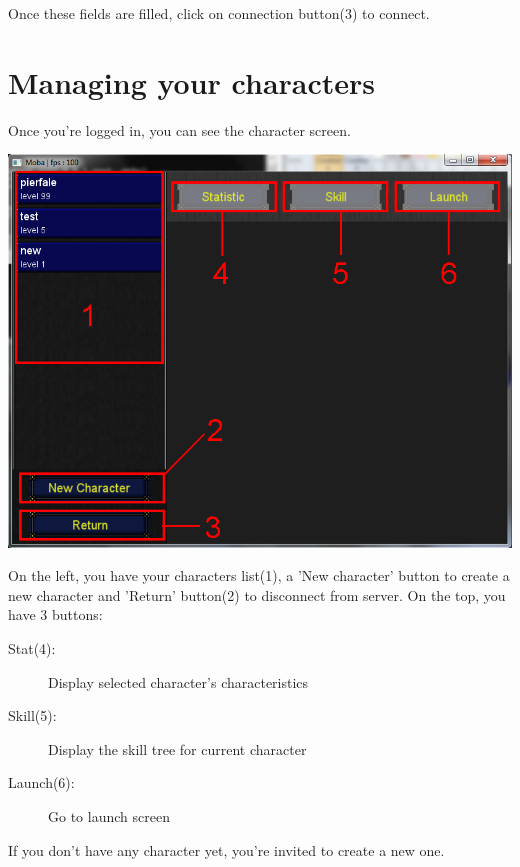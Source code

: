 \documentclass{scrreprt}
\begin{document}
		  Once these fields are filled, click on connection button(3) to connect.
		  
		  \section{Managing your characters}
		  Once you're logged in, you can see the character screen.
		  \begin{center}
		  \includegraphics[scale=0.4]{character_screen.png}
		  \end{center}
		  On the left, you have your characters list(1), a 'New character' button to create a new character and 'Return' button(2) to disconnect from server. On the top, you have 3 buttons:
		  \begin{description}
		  \item[Stat(4):]{Display selected character's characteristics}
		  \item[Skill(5):]{Display the skill tree for current character}
		  \item[Launch(6):]{Go to launch screen}
		  \end{description}
		  If you don't have any character yet, you're invited to create a new one.
\end{document}
